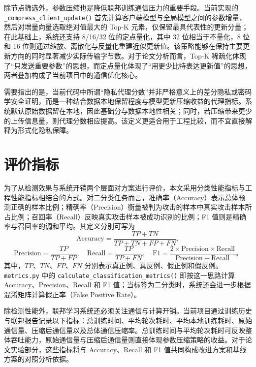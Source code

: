 除节点筛选外，参数压缩也是降低联邦训练通信压力的重要手段。当前实现的 \texttt{\_compress\_client\_update()} 首先计算客户端模型与全局模型之间的参数增量，然后对增量向量选取绝对值最大的 Top-K 元素，仅保留最具代表性的更新分量；在此基础上，系统还支持 8/16/32 位的定点量化，其中 32 位相当于不量化，8 位和 16 位则通过缩放、离散化与反量化重建近似更新值。该策略能够在保持主要更新方向的同时显著减少实际传输字节数。对于论文分析而言，Top-K 稀疏化体现了“只发送重要参数”的思想，而定点量化体现了“用更少比特表达更新值”的思想，两者叠加构成了当前项目中的通信优化核心。

需要指出的是，当前代码中所谓“隐私代理分数”并非严格意义上的差分隐私或密码学安全证明，而是一种结合数据本地保留程度与模型更新压缩收益的代理指标。系统默认原始数据留在本地，因此基础分与数据本地性相关；同时，若压缩带来更少的上传信息量，则代理分数相应提高。该定义更适合用于工程比较，而不宜直接解释为形式化隐私保障。

\section{评价指标}
\label{sec:related-metrics}

为了从检测效果与系统开销两个层面对方案进行评价，本文采用分类性能指标与工程性能指标相结合的方式。对二分类任务而言，准确率（Accuracy）表示总体预测正确的样本比例；精确率（Precision）衡量被判为攻击的样本中真实攻击样本所占比例；召回率（Recall）反映真实攻击样本被成功识别的比例；F1 值则是精确率与召回率的调和平均。其定义分别可写为
\begin{equation}
    \label{eq:metric-accuracy}
    \mathrm{Accuracy} = \frac{TP + TN}{TP + TN + FP + FN},
\end{equation}
\begin{equation}
    \label{eq:metric-precision-recall-f1}
    \mathrm{Precision} = \frac{TP}{TP + FP}, \quad
    \mathrm{Recall} = \frac{TP}{TP + FN}, \quad
    \mathrm{F1} = \frac{2 \times \mathrm{Precision} \times \mathrm{Recall}}{\mathrm{Precision} + \mathrm{Recall}}。
\end{equation}
其中，$TP$、$TN$、$FP$、$FN$ 分别表示真正例、真反例、假正例和假反例。\texttt{metrics.py} 中的 \texttt{calculate\_classification\_metrics()} 即按这一思路计算 Accuracy、Precision、Recall 和 F1 值；当标签为二分类时，系统还会进一步根据混淆矩阵计算假正率（False Positive Rate）。

除检测性能外，联邦学习系统还必须关注通信与计算开销。当前项目通过训练历史与联邦报告记录以下指标：总训练时间、平均轮次耗时、平均本地训练耗时、原始通信量、压缩后通信量以及总体通信压缩率。总训练时间与平均轮次耗时可反映整体吞吐能力，原始通信量与压缩后通信量则直接体现参数压缩策略的收益。对于论文实验部分，这些指标将与 Accuracy、Recall 和 F1 值共同构成改进方案和基线方案的对照分析依据。

